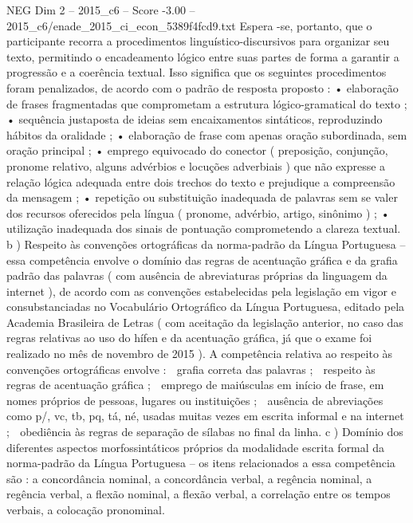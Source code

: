 \begin{textsample}{NEG Dim 2 – 2015\_c6 – Score -3.00 – 2015\_c6/enade\_2015\_ci\_econ\_5389f4fcd9.txt}
Espera -se, portanto, que o participante recorra a procedimentos linguístico-discursivos para organizar seu texto, permitindo o encadeamento lógico entre suas partes de forma a garantir a progressão e a coerência textual.
Isso significa que os seguintes procedimentos foram penalizados, de acordo com o padrão de resposta proposto : • elaboração de frases fragmentadas que comprometam a estrutura lógico-gramatical do texto ; • sequência justaposta de ideias sem encaixamentos sintáticos, reproduzindo hábitos da oralidade ; • elaboração de frase com apenas oração subordinada, sem oração principal ; • emprego equivocado do conector ( preposição, conjunção, pronome relativo, alguns advérbios e locuções adverbiais ) que não expresse a relação lógica adequada entre dois trechos do texto e prejudique a compreensão da mensagem ; • repetição ou substituição inadequada de palavras sem se valer dos recursos oferecidos pela língua ( pronome, advérbio, artigo, sinônimo ) ; • utilização inadequada dos sinais de pontuação comprometendo a clareza textual. b ) Respeito às convenções ortográficas da norma-padrão da Língua Portuguesa – essa competência envolve o domínio das regras de acentuação gráfica e da grafia padrão das palavras ( com ausência de abreviaturas próprias da linguagem da internet ), de acordo com as convenções estabelecidas pela legislação em vigor e consubstanciadas no Vocabulário Ortográfico da Língua Portuguesa, editado pela Academia Brasileira de Letras ( com aceitação da legislação anterior, no caso das regras relativas ao uso do hífen e da acentuação gráfica, já que o exame foi realizado no mês de novembro de 2015 ).
A competência relativa ao respeito às convenções ortográficas envolve :  grafia correta das palavras ;  respeito às regras de acentuação gráfica ;  emprego de maiúsculas em início de frase, em nomes próprios de pessoas, lugares ou instituições ;  ausência de abreviações como p/, vc, tb, pq, tá, né, usadas muitas vezes em escrita informal e na internet ;  obediência às regras de separação de sílabas no final da linha. c ) Domínio dos diferentes aspectos morfossintáticos próprios da modalidade escrita formal da norma-padrão da Língua Portuguesa – os itens relacionados a essa competência são : a concordância nominal, a concordância verbal, a regência nominal, a regência verbal, a flexão nominal, a flexão verbal, a correlação entre os tempos verbais, a colocação pronominal.

\end{textsample}
